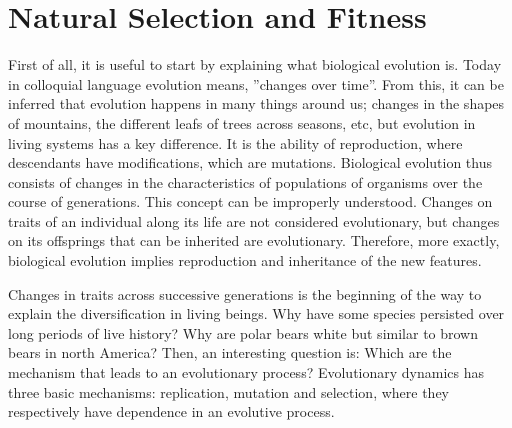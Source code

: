 
\chapter{Natural Selection and Fitness}
\ifpdf
    \graphicspath{{NaturalSelection/Chapter1Figs/PNG/}{NaturalSelection/Chapter1Figs/PDF/}{NaturalSelection/Chapter1Figs/}}
\else
    \graphicspath{{NaturalSelection/Chapter1Figs/EPS/}{NaturalSelection/Chapter1Figs/}}
\fi

First of all, it is useful to start by explaining what biological evolution is. Today in colloquial language evolution means, ''changes over time''. From this, it can be inferred that evolution happens in many things around us; changes in the shapes of mountains, the different  leafs of trees across seasons, etc, but evolution in living systems has a key difference. It is  the ability of reproduction, where descendants have modifications, which are mutations. Biological evolution thus consists of changes in the characteristics of populations of organisms over the course of generations. This concept can be improperly understood. Changes on traits of an individual along its life are not considered evolutionary, but changes on its offsprings that can be inherited are evolutionary. Therefore, more exactly, biological evolution implies reproduction and inheritance of the new features.     

Changes in traits  across  successive generations is the beginning  of the way to explain the diversification in living beings. Why have some species  persisted over long periods of live history? Why are polar bears  white but similar to brown bears in north America? Then, an interesting question is: Which are the mechanism that leads to an evolutionary process? Evolutionary dynamics has three basic mechanisms: replication, mutation and selection, where they respectively have dependence in an evolutive process\cite{NowakBook}.

